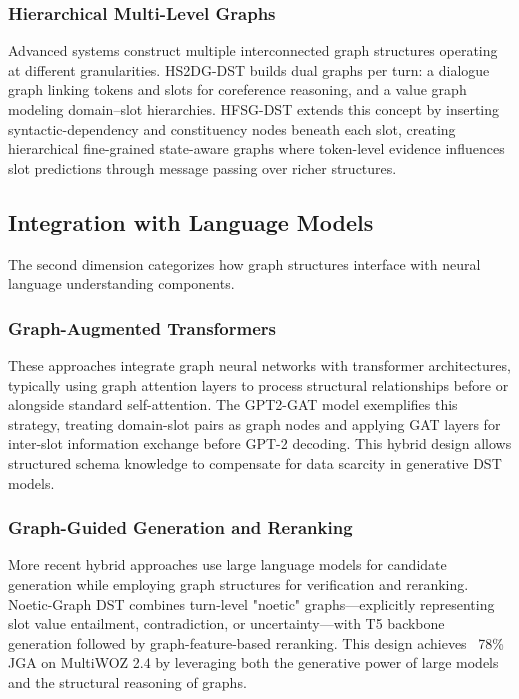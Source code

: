 \documentclass[11pt]{article}
\begin{document}
\subsubsection{Hierarchical Multi-Level Graphs}
Advanced systems construct multiple interconnected graph structures operating at different granularities. HS2DG-DST \citep{zhou2024hs2dg} builds dual graphs per turn: a dialogue graph linking tokens and slots for coreference reasoning, and a value graph modeling domain–slot hierarchies. HFSG-DST \citep{li2025hfsg} extends this concept by inserting syntactic-dependency and constituency nodes beneath each slot, creating hierarchical fine-grained state-aware graphs where token-level evidence influences slot predictions through message passing over richer structures.

\subsection{Integration with Language Models}

The second dimension categorizes how graph structures interface with neural language understanding components.

\subsubsection{Graph-Augmented Transformers}
These approaches integrate graph neural networks with transformer architectures, typically using graph attention layers to process structural relationships before or alongside standard self-attention. The GPT2-GAT model \citep{lin2021knowledge} exemplifies this strategy, treating domain-slot pairs as graph nodes and applying GAT layers for inter-slot information exchange before GPT-2 decoding. This hybrid design allows structured schema knowledge to compensate for data scarcity in generative DST models.

\subsubsection{Graph-Guided Generation and Reranking}
More recent hybrid approaches use large language models for candidate generation while employing graph structures for verification and reranking. Noetic-Graph DST \citep{li2025advanced} combines turn-level "noetic" graphs—explicitly representing slot value entailment, contradiction, or uncertainty—with T5 backbone generation followed by graph-feature-based reranking. This design achieves ~78\% JGA on MultiWOZ 2.4 by leveraging both the generative power of large models and the structural reasoning of graphs.
\end{document}
